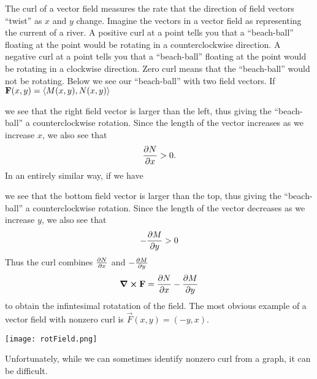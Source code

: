 \documentclass{ximera}
\begin{document}
The curl of a vector field measures the rate that the direction of
field vectors ``twist'' as $x$ and $y$ change. Imagine the vectors in
a vector field as representing the current of a river. A positive curl
at a point tells you that a ``beach-ball'' floating at the point would
be rotating in a counterclockwise direction. A negative curl at a
point tells you that a ``beach-ball'' floating at the point would be
rotating in a clockwise direction. Zero curl means that the
``beach-ball'' would not be rotating. Below we see our ``beach-ball''
with two field vectors. If $\vec{F}(x,y) = \vector{M(x,y),N(x,y)}$
\begin{image}
\end{image}
we see that the right field vector is larger than the left, thus
giving the ``beach-ball'' a counterclockwise rotation. Since the
length of the vector increases as we increase $x$, we also see that
\[
\pp[N]{x} > 0.
\]
In an entirely similar way, if we have
\begin{image}
\end{image}
we see that the bottom field vector is larger than the top, thus
giving the ``beach-ball'' a counterclockwise rotation. Since the
length of the vector decreases as we increase $y$, we also see that
\[
-\pp[M]{y} > 0
\]
Thus the curl combines $\pp[N]{x}$ and $-\pp[M]{y}$
\[
\curl\vec{F} = \pp[N]{x} - \pp[M]{y}
\]
to obtain the infintesimal rotatation of the field. The most obvious
example of a vector field with nonzero curl is $\vec{F}(x,y) =
(-y,x)$.
\begin{image}
  \texttt{[image: rotField.png]}
\end{image}
Unfortunately, while we can sometimes identify nonzero curl from a
graph, it can be difficult.
\end{document}
